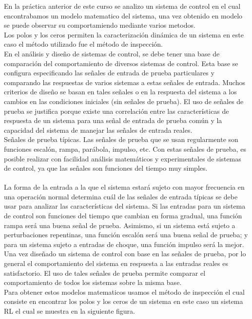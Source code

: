 \documentclass[12pt,letterpaper]{IEEEtran}
\begin{document}
	En la práctica anterior de este curso se analizo un sistema de control en el cual encontrabamos un modelo matematico del sistema, una vez obtenido en modelo se puede observar su comportamiendo mediante varios metodos.
	\\
	Los polos y los ceros permiten la caracterización dinámica de un sistema en este caso el método utilizado fue el método de inspección.
	\\
	En el análisis y diseño de sistemas de control, se debe tener una base de comparación del
	comportamiento de diversos sistemas de control. Esta base se configura especificando las señales
	de entrada de prueba particulares y comparando las respuestas de varios sistemas a estas señales
	de entrada.
	Muchos criterios de diseño se basan en tales señales o en la respuesta del sistema a los cambios
	en las condiciones iniciales (sin señales de prueba). El uso de señales de prueba se justifica
	porque existe una correlación entre las características de respuesta de un sistema para una señal
	de entrada de prueba común y la capacidad del sistema de manejar las señales de entrada reales. 
	\\Señales de prueba típicas. Las señales de prueba que se usan regularmente son funciones
	escalón, rampa, parábola, impulso, etc. Con estas señales de prueba, es posible realizar con
	facilidad análisis matemáticos y experimentales de sistemas de control, ya que las señales son funciones del tiempo muy simples.
	\\\\La forma de la entrada a la que el sistema estará sujeto con mayor frecuencia en una operación
	normal determina cuál de las señales de entrada típicas se debe usar para analizar las características
	del sistema. Si las entradas para un sistema de control son funciones del tiempo que
	cambian en forma gradual, una función rampa será una buena señal de prueba. Asimismo, si un
	sistema está sujeto a perturbaciones repentinas, una función escalón será una buena señal de prueba;
	y para un sistema sujeto a entradas de choque, una función impulso será la mejor. Una vez
	diseñado un sistema de control con base en las señales de prueba, por lo general el comportamiento
	del sistema en respuesta a las entradas reales es satisfactorio. El uso de tales señales de prueba
	permite comparar el comportamiento de todos los sistemas sobre la misma base.
	\\ Para obtener estos modelos matematicos usamos el método de inspección el cual consiste en encontrar los polos y los ceros de un sistema en este caso un sistema RL el cual se muestra en la siguiente figura.
	
\end{document}
